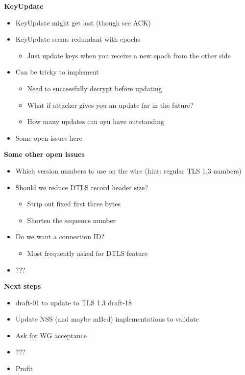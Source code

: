 \documentclass[helvetica]{seminar}
\newcommand{\heading}[1]{%
  \begin{center} 
    \large\bf 
    #1 
  \end{center} 
  \vspace{.4 in}}
\begin{document}
\begin{slide}
\heading{KeyUpdate}

\begin{itemize}
\item KeyUpdate might get lost (though see ACK)
\item KeyUpdate seems redundant with epochs
  \begin{itemize}
  \item Just update keys when you receive a new epoch from the other side
  \end{itemize}

\item Can be tricky to implement
  \begin{itemize}
  \item Need to successfully decrypt before updating
  \item What if attacker gives you an update far in the future?
  \item How many updates can oyu have outstanding
  \end{itemize}

\item Some open issues here
\end{itemize}
\end{slide}


\begin{slide}
\heading{Some other open issues}

\begin{itemize}
\item Which version numbers to use on the wire (hint: regular TLS 1.3 numbers)
\item Should we reduce DTLS record header size?
  \begin{itemize}
  \item Strip out fixed first three bytes
  \item Shorten the sequence number
  \end{itemize}
\item Do we want a connection ID?
  \begin{itemize}
  \item Most frequently asked for DTLS feature
  \end{itemize}
\item ???  
\end{itemize}

\end{slide}


\begin{slide}
\heading{Next steps}

\begin{itemize}
\item draft-01 to update to TLS 1.3 draft-18
\item Update NSS (and maybe mBed) implementations to validate
\item Ask for WG acceptance
\item ???
\item Profit
\end{itemize}

\end{slide}
\end{document}
